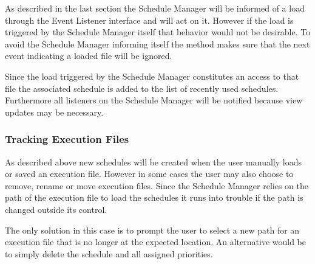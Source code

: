 As described in the last section the Schedule Manager will be informed of a load through the Event Listener
interface and will act on it. However if the load is triggered by the Schedule Manager itself that behavior
would not be desirable. To avoid the Schedule Manager informing itself the method makes sure that the next
event indicating a loaded file will be ignored.

Since the load triggered by the Schedule Manager constitutes an access to that file the associated schedule
is added to the list of recently used schedules. Furthermore all listeners on the Schedule Manager will
be notified because view updates may be necessary.


\subsubsection{Tracking Execution Files}
\label{section:TrackingExecutionFiles}
As described above new schedules will be created when the user manually loads or saved an execution file.
However in some cases the user may also choose to remove, rename or move execution files. Since the Schedule Manager
relies on the path of the execution file to load the schedules it runs into trouble if the path is changed outside
its control.

The only solution in this case is to prompt the user to select a new path for an execution file that is no
longer at the expected location. An alternative would be to simply delete the schedule and all assigned priorities.

\lstset{
backgroundcolor=,
}

